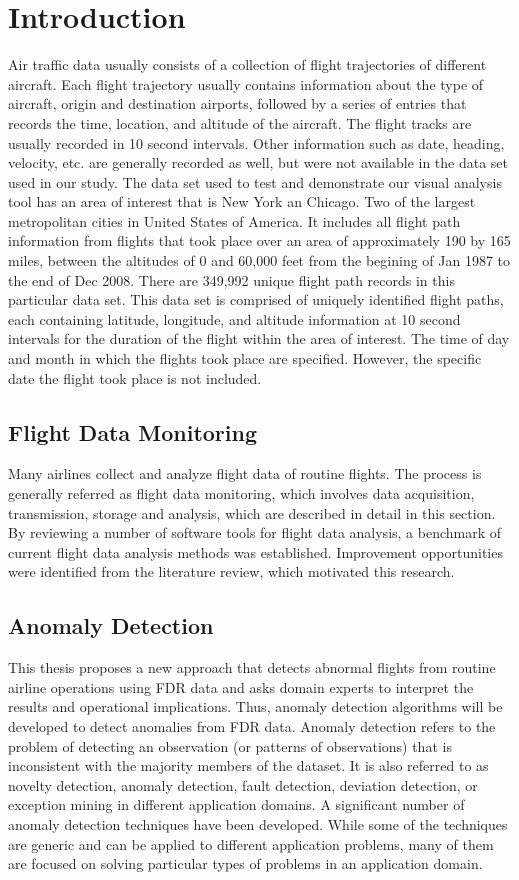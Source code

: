 \section{Introduction}
Air traffic data usually consists of a collection of flight trajectories of different aircraft. Each flight trajectory usually contains information about the type of aircraft, origin and destination airports, followed by a series of entries that records the time, location, and altitude of the aircraft. The flight tracks are usually recorded in 10 second intervals. Other information such as date, heading, velocity, etc. are generally
recorded as well, but were not available in the data set used in our study. The data set used to test and demonstrate our visual analysis tool has an area of interest that is New York an Chicago. Two of the largest metropolitan cities in United States of America. It includes all flight path information from flights that took place over an area of approximately 190 by 165 miles, between the altitudes of 0 and 60,000 feet from the begining of Jan 1987 to the end of Dec 2008. There are 349,992 unique flight path records in this particular data set. This data set is comprised of uniquely identified flight paths, each containing latitude, longitude, and altitude information at 10 second intervals for the duration of the flight within the area of interest. The time of day and month in which the flights took place are specified. However, the specific date the flight took place is not included.

\subsection{Flight Data Monitoring}
Many airlines collect and analyze flight data of routine flights. The process is generally referred as flight data monitoring, which involves data acquisition, transmission, storage and analysis, which are described in detail in this section. By reviewing a number of software tools for flight data analysis, a benchmark of current flight data analysis methods was established. Improvement opportunities were identified from the literature review, which motivated this research.
\subsection{Anomaly Detection}
This thesis proposes a new approach that detects abnormal flights from routine airline operations using FDR data and asks domain experts to interpret the results and operational implications. Thus, anomaly detection algorithms will be developed to detect anomalies from FDR data.
Anomaly detection refers to the problem of detecting an observation (or patterns of observations) that is inconsistent with the majority members of the dataset. It is also referred to as novelty detection, anomaly detection, fault detection, deviation detection, or exception mining in different application domains. A significant number of anomaly detection techniques have been developed. While some of the techniques are generic and can be applied to different application problems, many of them are focused on solving particular types of problems in an application domain.

